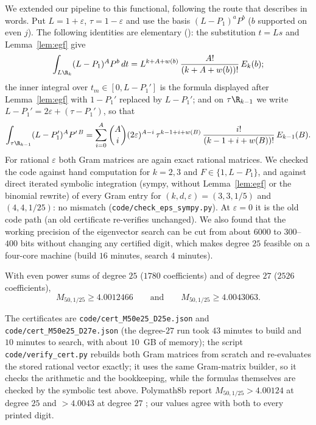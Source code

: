 We extended our pipeline to this functional, following the route that
\cite[\S7.2]{Pol14b} describes in words. Put $L=1+\varepsilon$,
$\tau=1-\varepsilon$ and use the basis $(L-P_1)^aP^b$ ($b$ supported on even
$j$). The following identities are elementary (): the
substitution $t=Ls$ and Lemma~\ref{lem:egf} give
\[
\int_{L\R_k}(L-P_1)^AP^b\,dt=L^{k+A+w(b)}\,\frac{A!}{(k+A+w(b))!}\,E_k(b);
\]
the inner integral over $t_m\in[0,L-P_1']$ is the formula displayed after
Lemma~\ref{lem:egf} with $1-P_1'$ replaced by $L-P_1'$; and on
$\tau\R_{k-1}$ we write $L-P_1'=2\varepsilon+(\tau-P_1')$, so that
\[
\int_{\tau\R_{k-1}}(L-P_1')^AP'^{\,B}=\sum_{i=0}^{A}\binom Ai(2\varepsilon)^{A-i}\,
\tau^{k-1+i+w(B)}\,\frac{i!}{(k-1+i+w(B))!}\,E_{k-1}(B).
\]
For rational $\varepsilon$ both Gram matrices are again exact rational
matrices. We checked the code against hand computation for $k=2,3$ and
$F\in\{1,L-P_1\}$, and against direct iterated symbolic integration (sympy,
without Lemma~\ref{lem:egf} or the binomial rewrite) of every Gram entry for
$(k,d,\varepsilon)=(3,3,1/5)$ and $(4,4,1/25)$: no mismatch
(\texttt{code/check\_eps\_sympy.py}). At $\varepsilon=0$ it is the old code
path (an old certificate re-verifies unchanged). We also found that the working precision of
the eigenvector search can be cut from about $6000$ to $300$--$400$ bits
without changing any certified digit, which makes degree $25$ feasible on a
four-core machine (build $16$ minutes, search $4$ minutes).

\begin{theorem}\label{thm:Meps}
With even power sums of degree $25$ ($1780$ coefficients) and of degree $27$
($2526$ coefficients),
\[
M_{50,1/25}\ge4.0012466\qquad\text{and}\qquad M_{50,1/25}\ge4.0043063 .
\]
\end{theorem}

The certificates are \texttt{code/cert\_M50e25\_D25e.json} and
\texttt{code/cert\_M50e25\_D27e.json} (the degree-$27$ run took $43$ minutes
to build and $10$ minutes to search, with about $10$~GB of memory); the script
\texttt{code/verify\_cert.py} rebuilds both Gram matrices from scratch and
re-evaluates the stored rational vector exactly; it uses the same
Gram-matrix builder, so it checks the arithmetic and the bookkeeping, while
the formulas themselves are checked by the symbolic test above. Polymath8b report
$M_{50,1/25}>4.00124$ at degree $25$ and $>4.0043$ at degree $27$
\cite[\S7.2]{Pol14b}; our values agree with both to every printed digit.


